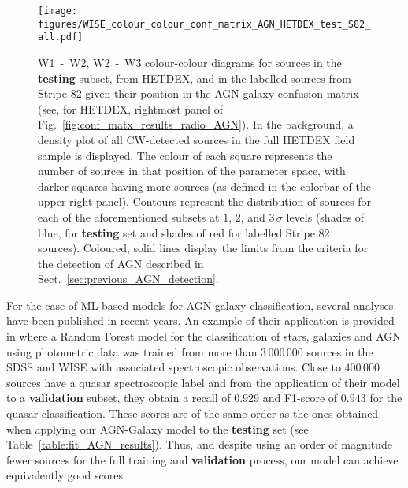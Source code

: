 \documentclass{aa}
\begin{document}
\begin{figure*}
   \centering
   \texttt{[image: figures/WISE\_colour\_colour\_conf\_matrix\_AGN\_HETDEX\_test\_S82\_all.pdf]}
   \caption{W1~-~W2, W2~-~W3 colour-colour diagrams for sources in the \textbf{testing} subset, from HETDEX, and in the labelled sources from Stripe 82 given their position in the AGN-galaxy confusion matrix (see, for HETDEX, rightmost panel of Fig.~\ref{fig:conf_matx_results_radio_AGN}). In the background, a density plot of all CW-detected sources in the full HETDEX field sample is displayed. The colour of each square represents the number of sources in that position of the parameter space, with darker squares having more sources (as defined in the colorbar of the upper-right panel). Contours represent the distribution of sources for each of the aforementioned subsets at $1$, $2$, and $3\,\sigma$ levels (shades of blue, for \textbf{testing} set and shades of red for labelled Stripe 82 sources). Coloured, solid lines display the limits from the criteria for the detection of AGN described in Sect.~\ref{sec:previous_AGN_detection}.}
   \label{fig:W1_W2_W2_W3_AGN_pred_HETDEX_S82}
\end{figure*}


For the case of ML-based models for AGN-galaxy classification, several analyses have been published in recent years. An example of their application is provided in \citet{2020A&A...639A..84C} where a Random Forest model for the classification of stars, galaxies and AGN using photometric data was trained from more than \textbf{$3\,000\,000$} sources in the SDSS \citep[DR15;][]{2019ApJS..240...23A} and WISE with associated spectroscopic observations. Close to $400\,000$ sources have a quasar spectroscopic label and from the application of their model to a \textbf{validation} subset, they obtain a recall of $0.929$ and F1-score of $0.943$ for the quasar classification. These scores are of the same order as the ones obtained when applying our AGN-Galaxy model to the \textbf{testing} set (see Table~\ref{table:fit_AGN_results}). Thus, and despite using an order of magnitude fewer sources for the full training and \textbf{validation} process, our model can achieve equivalently good scores. 
\end{document}
